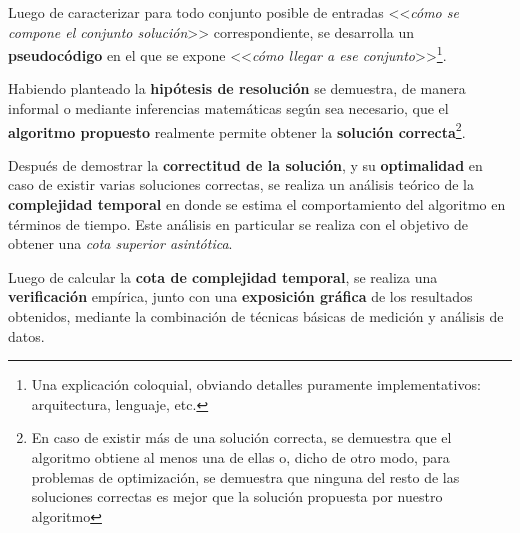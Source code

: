 \documentclass[11pt, a4paper, twoside]{article}
\begin{document}
Luego de caracterizar para todo conjunto posible de entradas <<\textit{cómo se compone el conjunto solución}>> correspondiente, se desarrolla un \textbf{pseudocódigo} en el que se expone <<\textit{cómo llegar a ese conjunto}>>\footnote{Una explicación coloquial, obviando detalles puramente implementativos: arquitectura, lenguaje, etc.}.

Habiendo planteado la \textbf{hipótesis de resolución} se demuestra, de manera informal o mediante inferencias matemáticas según sea necesario, que el \textbf{algoritmo propuesto} realmente permite obtener la \textbf{solución correcta}\footnote{En caso de existir más de una solución correcta, se demuestra que el algoritmo obtiene al menos una de ellas o, dicho de otro modo, para problemas de optimización, se demuestra que ninguna del resto de las soluciones correctas es mejor que la solución propuesta por nuestro algoritmo}.

Después de demostrar la \textbf{correctitud de la solución}, y su \textbf{optimalidad} en caso de existir varias soluciones correctas, se realiza un análisis teórico de la \textbf{complejidad temporal} en donde se estima el comportamiento del algoritmo en términos de tiempo. Este análisis en particular se realiza con el objetivo de obtener una \textit{cota superior asintótica}.

Luego de calcular la \textbf{cota de complejidad temporal}, se realiza una \textbf{verificación} empírica, junto con una \textbf{exposición gráfica} de los resultados obtenidos, mediante la combinación de técnicas básicas de medición y análisis de datos.
\end{document}
